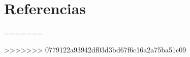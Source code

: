 \documentclass[spanish,12pt,a4paper]{article}
\begin{document}
	\section*{Referencias}
	
	\printbibliography
=======
	\begin{multicols}{2}
		\printbibliography
	\end{multicols}
	
>>>>>>> 0779122a93942df03d3bd67f6c16a2a75ba51c09
	
\end{document}
